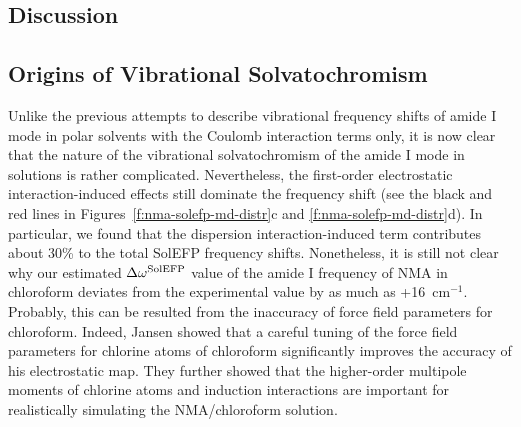 \documentclass[a4paper,titlepage,twoside,fleqn,12pt]{book}
\begin{document}
\begin{refsection}
\section{Discussion}

\subsection{Origins of Vibrational Solvatochromism\label{s:amide-I-discuss-origins}}

Unlike the previous attempts to describe vibrational
frequency shifts of amide I mode in polar solvents with the
Coulomb interaction terms only, it is now clear that the nature
of the vibrational solvatochromism of the amide I mode in
solutions is rather complicated. Nevertheless, the first\hyp{}order
electrostatic interaction\hyp{}induced effects still dominate the
frequency shift (see the black and red lines in Figures~\ref{f:nma-solefp-md-distr}c 
and \ref{f:nma-solefp-md-distr}d). 
In particular, we found that the dispersion interaction\hyp{}induced
term contributes about 30\% to the total SolEFP
frequency shifts. Nonetheless, it is still not clear why our
estimated $\Delta\omega^{\rm SolEFP}$ value of the amide I frequency of NMA in
chloroform deviates from the experimental value by as much
as +16~cm$^{-1}$. Probably, this can be resulted from the inaccuracy
of force field parameters for chloroform. Indeed, Jansen \citep{Jansen.JPCB.2014}
showed that a careful tuning of the force field parameters
for chlorine atoms of chloroform significantly improves the
accuracy of his electrostatic map. They further showed that
the higher\hyp{}order multipole moments of chlorine atoms and
induction interactions are important for realistically simulating
the NMA/chloroform solution.


\end{refsection}
\end{document}
